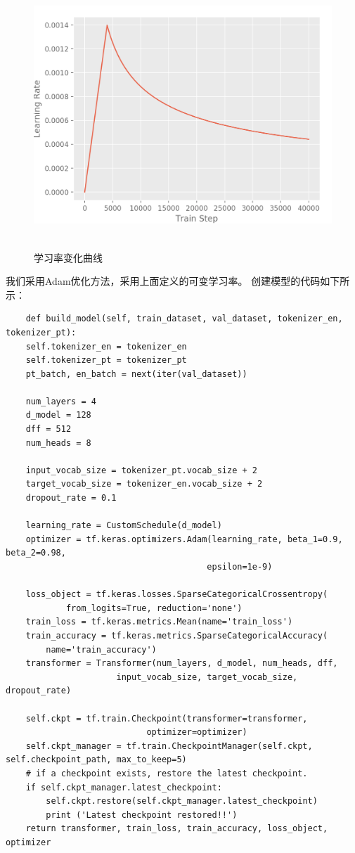 \documentclass{article}
\begin{document}
\begin{figure}[H]
    \caption{学习率变化曲线}
    \label{f000087}
    \centering
    \includegraphics[height=10cm]{images/f000087}
\end{figure}
我们采用Adam优化方法，采用上面定义的可变学习率。\newline
创建模型的代码如下所示：
\begin{lstlisting}
    def build_model(self, train_dataset, val_dataset, tokenizer_en, tokenizer_pt):
    self.tokenizer_en = tokenizer_en
    self.tokenizer_pt = tokenizer_pt
    pt_batch, en_batch = next(iter(val_dataset))

    num_layers = 4
    d_model = 128
    dff = 512
    num_heads = 8

    input_vocab_size = tokenizer_pt.vocab_size + 2
    target_vocab_size = tokenizer_en.vocab_size + 2
    dropout_rate = 0.1

    learning_rate = CustomSchedule(d_model)
    optimizer = tf.keras.optimizers.Adam(learning_rate, beta_1=0.9, beta_2=0.98, 
                                        epsilon=1e-9)

    loss_object = tf.keras.losses.SparseCategoricalCrossentropy(
            from_logits=True, reduction='none')
    train_loss = tf.keras.metrics.Mean(name='train_loss')
    train_accuracy = tf.keras.metrics.SparseCategoricalAccuracy(
        name='train_accuracy')
    transformer = Transformer(num_layers, d_model, num_heads, dff,
                      input_vocab_size, target_vocab_size, dropout_rate)

    self.ckpt = tf.train.Checkpoint(transformer=transformer,
                            optimizer=optimizer)
    self.ckpt_manager = tf.train.CheckpointManager(self.ckpt, self.checkpoint_path, max_to_keep=5)
    # if a checkpoint exists, restore the latest checkpoint.
    if self.ckpt_manager.latest_checkpoint:
        self.ckpt.restore(self.ckpt_manager.latest_checkpoint)
        print ('Latest checkpoint restored!!')
    return transformer, train_loss, train_accuracy, loss_object, optimizer
\end{lstlisting}
\end{document}
